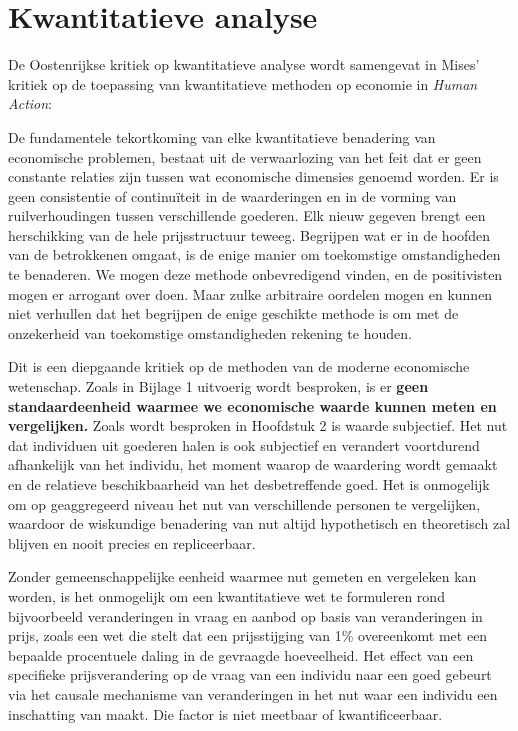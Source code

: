 \section{Kwantitatieve analyse}

De Oostenrijkse kritiek op kwantitatieve analyse wordt samengevat in Mises’ kritiek op de toepassing van kwantitatieve methoden op economie in \textit{Human Action}:


\begin{blockquotebox}
De fundamentele tekortkoming van elke kwantitatieve benadering van economische problemen, bestaat uit de verwaarlozing van het feit dat er geen constante relaties zijn tussen wat economische dimensies genoemd worden. Er is geen consistentie of continuïteit in de waarderingen en in de vorming van ruilverhoudingen tussen verschillende goederen. Elk nieuw gegeven brengt een herschikking van de hele prijsstructuur teweeg. Begrijpen wat er in de hoofden van de betrokkenen omgaat, is de enige manier om toekomstige omstandigheden te benaderen.  We mogen deze methode onbevredigend vinden, en de positivisten mogen er arrogant over doen. Maar zulke arbitraire oordelen mogen en kunnen niet verhullen dat het begrijpen de enige geschikte methode is om met de onzekerheid van toekomstige omstandigheden rekening te houden.\footnotemark
\end{blockquotebox}
\autocite{8}


Dit is een diepgaande kritiek op de methoden van de moderne economische wetenschap. Zoals in Bijlage 1 uitvoerig wordt besproken, is er \textbf{geen standaardeenheid waarmee we economische waarde kunnen meten en vergelijken.} Zoals wordt besproken in Hoofdstuk 2 is waarde subjectief. Het nut dat individuen uit goederen halen is ook subjectief en verandert voortdurend afhankelijk van het individu, het moment waarop de waardering wordt gemaakt en de relatieve beschikbaarheid van het desbetreffende goed. Het is onmogelijk om op geaggregeerd niveau het nut van verschillende personen te vergelijken, waardoor de wiskundige benadering van nut altijd hypothetisch en theoretisch zal blijven en nooit precies en repliceerbaar.

Zonder gemeenschappelijke eenheid waarmee nut gemeten en vergeleken kan worden, is het onmogelijk om een kwantitatieve wet te formuleren rond bijvoorbeeld veranderingen in vraag en aanbod op basis van veranderingen in prijs, zoals een wet die stelt dat een prijsstijging van 1\% overeenkomt met een bepaalde procentuele daling in de gevraagde hoeveelheid. Het effect van een specifieke prijsverandering op de vraag van een individu naar een goed gebeurt via het causale mechanisme van veranderingen in het nut waar een individu een inschatting van maakt. Die factor is niet meetbaar of kwantificeerbaar.

